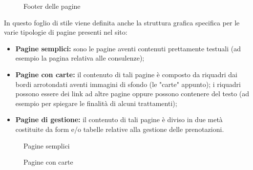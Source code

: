 \documentclass[]{article}
\begin{document}
\begin{figure}[H]
	\centering
	\caption{Footer delle pagine}
\end{figure}

In questo foglio di stile viene definita anche la struttura grafica specifica per le varie tipologie di pagine presenti nel sito:
\begin{itemize}
	\item \textbf{Pagine semplici:} sono le pagine aventi contenuti prettamente testuali (ad esempio la pagina relativa alle consulenze);
	\item \textbf{Pagine con carte:} il contenuto di tali pagine è composto da riquadri dai bordi arrotondati aventi immagini di sfondo (le "carte" appunto); i riquadri possono essere dei link ad altre pagine oppure possono contenere del testo (ad esempio per spiegare le finalità di alcuni trattamenti);
	\item \textbf{Pagine di gestione:} il contenuto di tali pagine è diviso in due metà costituite da form e/o tabelle relative alla gestione delle prenotazioni.
\end{itemize}

\begin{figure}[H]
	\centering
	\caption{Pagine semplici}
\end{figure}

\begin{figure}[H]
	\centering
	\caption{Pagine con carte}
\end{figure}
\end{document}
